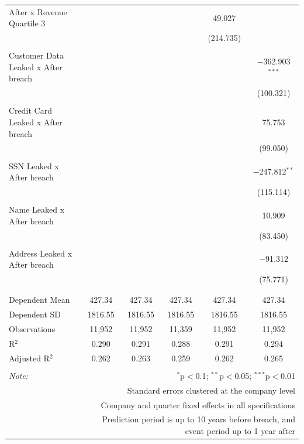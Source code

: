 \documentclass[../Main.tex]{subfiles}
\begin{document}
\begin{table}[!htbp]
{\begin{tabular}{@{\extracolsep{5pt}}lccccc}
 After x Revenue Quartile 3 &  &  &  & 49.027 &  \\ 
  &  &  &  & (214.735) &  \\ 
  & & & & & \\ 
 Customer Data Leaked x After breach &  &  &  &  & $-$362.903$^{***}$ \\ 
  &  &  &  &  & (100.321) \\ 
  & & & & & \\ 
 Credit Card Leaked x After breach &  &  &  &  & 75.753 \\ 
  &  &  &  &  & (99.050) \\ 
  & & & & & \\ 
 SSN Leaked x After breach &  &  &  &  & $-$247.812$^{**}$ \\ 
  &  &  &  &  & (115.114) \\ 
  & & & & & \\ 
 Name Leaked x After breach &  &  &  &  & 10.909 \\ 
  &  &  &  &  & (83.450) \\ 
  & & & & & \\ 
 Address Leaked x After breach &  &  &  &  & $-$91.312 \\ 
  &  &  &  &  & (75.771) \\ 
  & & & & & \\ 
\hline \\[-1.8ex] 
Dependent Mean & 427.34 & 427.34 & 427.34 & 427.34 & 427.34 \\ 
Dependent SD & 1816.55 & 1816.55 & 1816.55 & 1816.55 & 1816.55 \\ 
Observations & 11,952 & 11,952 & 11,359 & 11,952 & 11,952 \\ 
R$^{2}$ & 0.290 & 0.291 & 0.288 & 0.291 & 0.294 \\ 
Adjusted R$^{2}$ & 0.262 & 0.263 & 0.259 & 0.262 & 0.265 \\ 
\hline 
\hline \\[-1.8ex] 
\textit{Note:}  & \multicolumn{5}{r}{$^{*}$p$<$0.1; $^{**}$p$<$0.05; $^{***}$p$<$0.01} \\ 
 & \multicolumn{5}{r}{Standard errors clustered at the company level} \\ 
 & \multicolumn{5}{r}{Company and quarter fixed effects in all specifications} \\ 
 & \multicolumn{5}{r}{Prediction period is up to 10 years before breach, and event period up to 1 year after} \\ 
\end{tabular}} 
\end{table} 
\end{document}
